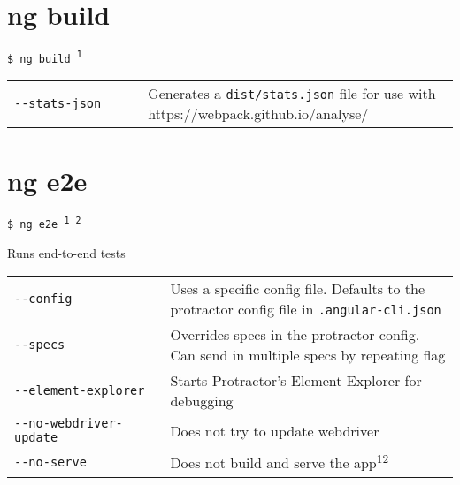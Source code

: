 \documentclass[8pt]{extarticle} %
\begin{document}
\begin{multicols}{3}
  \vspace{0.6ex}

\section*{ng build}

  \vspace{1ex}
  {\tt \$ ng build \textsuperscript{1} \itt{[options...]}}

  \vspace{0.6ex}

  {\small }

  \vspace{0.6ex}

  \begin{tabular}{L{0.30\linewidth} L{0.70\linewidth}}
    \tt -{}-stats-json & \small Generates a {\tt dist/stats.json} file for use with https://webpack.github.io/analyse/
  \end{tabular}

\section*{ng e2e}

  \vspace{1ex}
  {\tt \$ ng e2e {\small {}\textsuperscript{1} \textsuperscript{2}} \itt{[options...]}}

  \vspace{0.6ex}

  {\small Runs end-to-end tests}

  \vspace{0.6ex}

  \begin{tabular}{L{0.35\linewidth} L{0.65\linewidth}}
    \tt -{}-config  & \small Uses a specific config file. Defaults to the protractor config file in {\tt .angular-cli.json} \\
    \tt -{}-specs  & \small Overrides specs in the protractor config. Can send in multiple specs by repeating flag \\
    \tt -{}-element-explorer & \small Starts Protractor's Element Explorer for debugging \\
    \tt -{}-no-webdriver-update & \small Does not try to update webdriver \\
    \tt -{}-no-serve & \small Does not build and serve the app\textsuperscript{1}\textsuperscript{2} \\
  \end{tabular}


\end{multicols}
\end{document}
